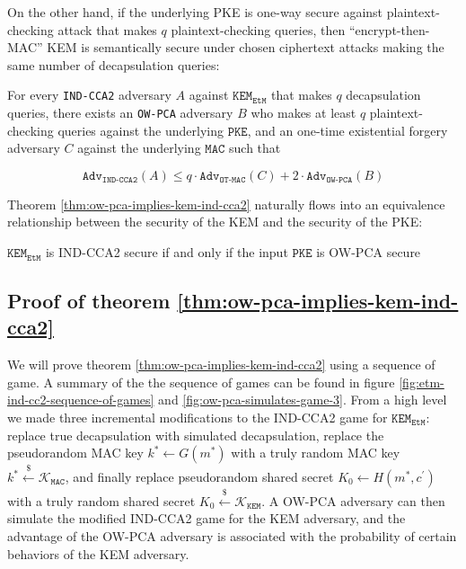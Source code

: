 \documentclass[journal=tches,submission]{iacrtrans}
\newcommand{\pke}{\texttt{PKE}}
\newcommand{\kem}{\texttt{KEM}}
\newcommand{\etm}{\texttt{EtM}}  %
\newcommand{\mac}{\texttt{MAC}}
\newcommand{\leftsample}{\stackrel{\$}{\leftarrow}}
\newcommand{\adv}{\texttt{Adv}}
\begin{document}
On the other hand, if the underlying PKE is one-way secure against plaintext-checking attack that makes $q$ plaintext-checking queries, then ``encrypt-then-MAC'' KEM is semantically secure under chosen ciphertext attacks making the same number of decapsulation queries:

\begin{theorem}\label{thm:ow-pca-implies-kem-ind-cca2}
    For every \texttt{IND-CCA2} adversary $A$ against $\kem_\etm$ that makes $q$ decapsulation queries, there exists an \texttt{OW-PCA} adversary $B$ who makes at least $q$ plaintext-checking queries against the underlying $\pke$, and an one-time existential forgery adversary $C$ against the underlying $\mac$ such that

    \begin{equation*}
        \texttt{Adv}_\texttt{IND-CCA2}(A) \leq q \cdot \adv_\texttt{OT-MAC}(C) + 2 \cdot \texttt{Adv}_\texttt{OW-PCA}(B)
    \end{equation*}
\end{theorem}

Theorem \ref{thm:ow-pca-implies-kem-ind-cca2} naturally flows into an equivalence relationship between the security of the KEM and the security of the PKE:

\begin{lemma}
    $\kem_\etm$ is IND-CCA2 secure if and only if the input $\pke$ is OW-PCA secure
\end{lemma}

\subsection{Proof of theorem \ref{thm:ow-pca-implies-kem-ind-cca2}}
We will prove theorem \ref{thm:ow-pca-implies-kem-ind-cca2} using a sequence of game. A summary of the the sequence of games can be found in figure \ref{fig:etm-ind-cc2-sequence-of-games} and \ref{fig:ow-pca-simulates-game-3}. From a high level we made three incremental modifications to the IND-CCA2 game for $\kem_\etm$: replace true decapsulation with simulated decapsulation, replace the pseudorandom MAC key $k^\ast \leftarrow G(m^\ast)$ with a truly random MAC key $k^\ast \leftsample \mathcal{K}_\mac$, and finally replace pseudorandom shared secret $K_0 \leftarrow H(m^\ast, c^\prime)$ with a truly random shared secret $K_0 \leftsample \mathcal{K}_\kem$. A OW-PCA adversary can then simulate the modified IND-CCA2 game for the KEM adversary, and the advantage of the OW-PCA adversary is associated with the probability of certain behaviors of the KEM adversary.
\end{document}
